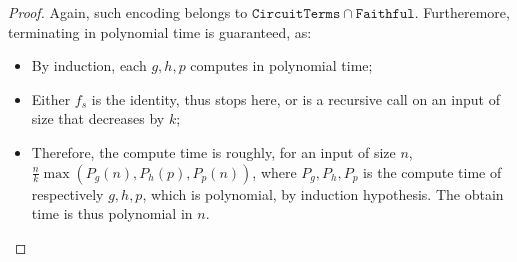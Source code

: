 \documentclass[10pt,a4paper]{article}
\newcommand{\circuittype}{\ensuremath{\mathtt{CircuitTerms}}}
\newcommand{\boundedrec}{\ensuremath{\mathtt{Faithful}}}
\begin{document}
\begin{proof}
  Again, such encoding belongs to $\circuittype \cap \boundedrec$.
  Furtheremore, terminating in polynomial time is guaranteed, as:
  \begin{itemize}
    \item By induction, each $g,h,p$ computes in polynomial time;
    \item Either $f_s$ is the identity, thus stops here, or is a recursive
      call on an input of size that decreases by $k$;
    \item Therefore, the compute time is roughly, for an input of size
      $n$, $\frac n k \max(P_g(n),P_h(p),P_p(n))$, where $P_g, P_h,P_p$ is the
      compute time of respectively $g,h,p$, which is polynomial, by
      induction hypothesis. The obtain time is thus polynomial in $n$. \qedhere
  \end{itemize}
\end{proof}




\end{document}

